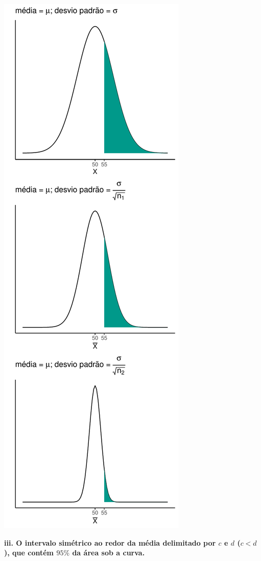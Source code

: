 \documentclass[
]{book}
\begin{document}
\includegraphics{probest-cambientais_files/figure-latex/unnamed-chunk-96-1.pdf}

\textbf{iii. O intervalo simétrico ao redor da média delimitado por \(c\) e \(d\) (\(c < d\)), que contém \(95\%\) da área sob a curva.}
\end{document}
